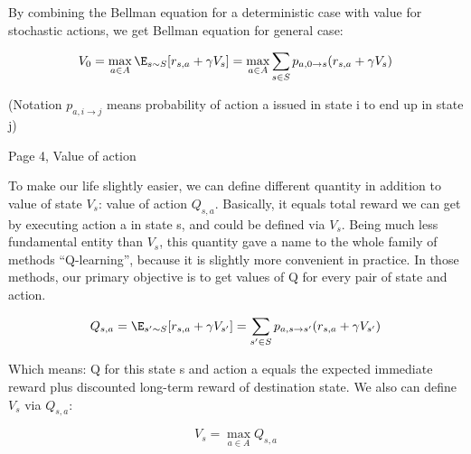 By combining the Bellman
equation for a deterministic case with value for stochastic actions, we get
Bellman equation for general case:

\begin{equation*}
V_0 = \max_{a \in A}\E_{s \sim S}[r_{s,a} + \gamma V_s] = \max_{a \in A} \sum_{s \in S}
p_{a,0 \rightarrow s}(r_{s,a} + \gamma V_s)
\end{equation*}

(Notation \begin{math}p_{a,i \rightarrow j}\end{math} means probability of action a issued in
state i to end up in state j)



Page 4, Value of action

To make our life slightly easier, we can define different quantity in addition
to value of state \begin{math}V_s\end{math}: value of action \begin{math}Q_{s,a}\end{math}. Basically, it equals total
reward we can get by executing action a in state s, and could be defined via
\begin{math}V_s\end{math}. Being much less fundamental entity than \begin{math}V_s\end{math}, this quantity gave a name to
the whole family of methods “Q-learning”, because it is slightly more convenient
in practice. In those methods, our primary objective is to get values of Q for
every pair of state and action.

\begin{equation*}
  Q_{s,a} = \E_{s' \sim S}[r_{s,a} + \gamma V_{s'}] =
  \sum_{s' \in S} p_{a,s \rightarrow s'}(r_{s,a} + \gamma V_{s'})
\end{equation*}

Which means: Q for this state s and action a equals the expected immediate
reward plus discounted long-term reward of destination state. We also can define
\begin{math}V_s\end{math} via \begin{math}Q_{s, a}\end{math}:

\begin{equation*}
  V_s = \max_{a \in A} Q_{s,a}
\end{equation*}


